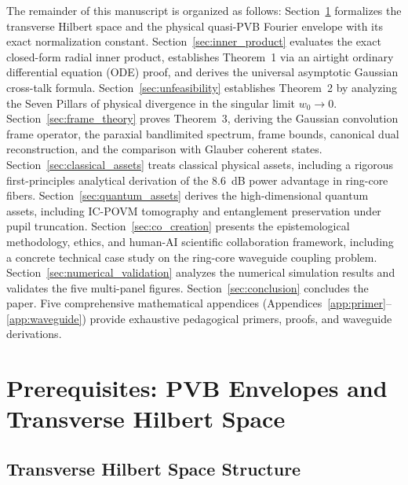 \documentclass[11pt,a4paper]{article}
\begin{document}
The remainder of this manuscript is organized as follows: Section~\ref{sec:prerequisites} formalizes the transverse Hilbert space and the physical quasi-PVB Fourier envelope with its exact normalization constant. Section~\ref{sec:inner_product} evaluates the exact closed-form radial inner product, establishes Theorem~1 via an airtight ordinary differential equation (ODE) proof, and derives the universal asymptotic Gaussian cross-talk formula. Section~\ref{sec:unfeasibility} establishes Theorem~2 by analyzing the Seven Pillars of physical divergence in the singular limit $w_0 \to 0$. Section~\ref{sec:frame_theory} proves Theorem~3, deriving the Gaussian convolution frame operator, the paraxial bandlimited spectrum, frame bounds, canonical dual reconstruction, and the comparison with Glauber coherent states. Section~\ref{sec:classical_assets} treats classical physical assets, including a rigorous first-principles analytical derivation of the 8.6~dB power advantage in ring-core fibers. Section~\ref{sec:quantum_assets} derives the high-dimensional quantum assets, including IC-POVM tomography and entanglement preservation under pupil truncation. Section~\ref{sec:co_creation} presents the epistemological methodology, ethics, and human-AI scientific collaboration framework, including a concrete technical case study on the ring-core waveguide coupling problem. Section~\ref{sec:numerical_validation} analyzes the numerical simulation results and validates the five multi-panel figures. Section~\ref{sec:conclusion} concludes the paper. Five comprehensive mathematical appendices (Appendices~\ref{app:primer}--\ref{app:waveguide}) provide exhaustive pedagogical primers, proofs, and waveguide derivations.

\section{Prerequisites: PVB Envelopes and Transverse Hilbert Space}
\label{sec:prerequisites}

\subsection{Transverse Hilbert Space Structure}
\end{document}

